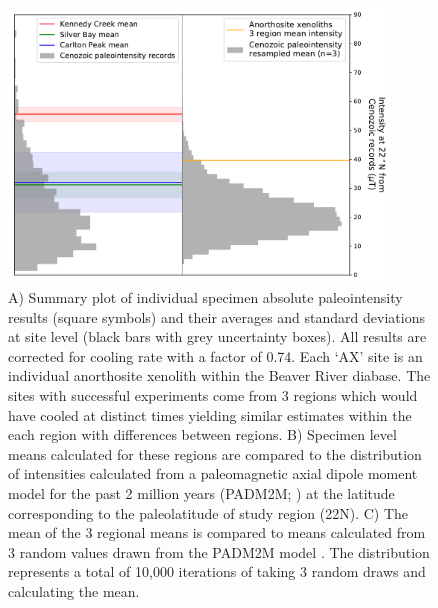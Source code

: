 \documentclass[9pt,twoside,lineno]{pnas-new}
\begin{document}
\begin{figure}[h!]
\noindent\includegraphics[width=0.9\textwidth]{Cenozoic_resample.pdf}
\centering
\caption{\footnotesize{A) Summary plot of individual specimen absolute paleointensity results (square symbols) and their averages and standard deviations at site level (black bars with grey uncertainty boxes). All results are corrected for cooling rate with a factor of 0.74. Each `AX' site is an individual anorthosite xenolith within the Beaver River diabase. The sites with successful experiments come from 3 regions which would have cooled at distinct times yielding similar estimates within the each region with differences between regions. B) Specimen level means calculated for these regions are compared to the distribution of intensities calculated from a paleomagnetic axial dipole moment model for the past 2 million years (PADM2M; \citealp{Ziegler2011a}) at the latitude corresponding to the paleolatitude of study region (22\textdegree N). C) The mean of the 3 regional means is compared to means calculated from 3 random values drawn from the PADM2M model \cite{Ziegler2011a}. The distribution represents a total of 10,000 iterations of taking 3 random draws and calculating the mean.}}
\label{fig:Cenozoic_PINT}
\end{figure}


\clearpage
\end{document}
